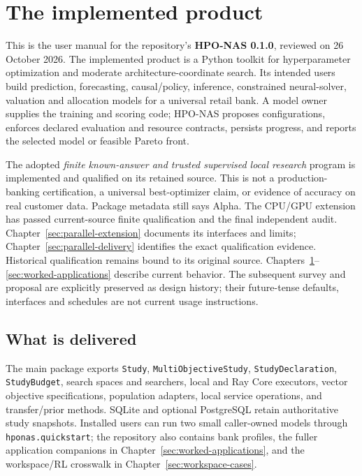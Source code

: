 \chapter{The implemented product}
\label{sec:current-product}

This is the user manual for the repository's \textbf{HPO-NAS 0.1.0}, reviewed
on 26 October 2026. The implemented product is a Python toolkit for
hyperparameter optimization and moderate architecture-coordinate search. Its
intended users build prediction, forecasting, causal/policy, inference,
constrained neural-solver, valuation and allocation models for a universal
retail bank. A model owner supplies the training and scoring code; HPO-NAS
proposes configurations, enforces declared evaluation and resource contracts,
persists progress, and reports the selected model or feasible Pareto front.

\begin{decisions}
The adopted \emph{finite known-answer and trusted supervised local research}
program is implemented and qualified on its retained source. This is not a
production-banking certification, a universal best-optimizer claim, or evidence
of accuracy on real customer data. Package metadata still says Alpha.
The CPU/GPU extension has passed current-source finite qualification and
the final independent audit. Chapter~\ref{sec:parallel-extension} documents
its interfaces and limits; Chapter~\ref{sec:parallel-delivery} identifies
the exact qualification evidence. Historical qualification remains
bound to its original source.
Chapters~\ref{sec:current-product}--\ref{sec:worked-applications} describe
current behavior. The subsequent survey and proposal are explicitly preserved
as design history; their future-tense defaults, interfaces and schedules are
not current usage instructions.
\end{decisions}

\section{What is delivered}

The main package exports \texttt{Study}, \texttt{MultiObjectiveStudy},
\texttt{StudyDeclaration}, \texttt{StudyBudget}, search spaces and searchers,
local and Ray Core executors, vector objective specifications, population
adapters, local service operations, and transfer/prior methods. SQLite and
optional PostgreSQL retain authoritative study snapshots. Installed users can
run two small caller-owned models through \texttt{hponas.quickstart}; the
repository also contains bank profiles, the fuller application companions in
Chapter~\ref{sec:worked-applications}, and the workspace/RL crosswalk in
Chapter~\ref{sec:workspace-cases}.


